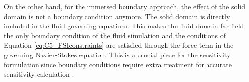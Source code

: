 On the other hand, for the immersed boundary approach, the effect of the solid domain is not a boundary condition anymore. The solid domain is directly included in the fluid governing equations. This makes the fluid domain far-field the only boundary condition of the fluid simulation and the conditions of Equation \eqref{eq:C5_FSIconstraints} are satisfied through the force term in the governing Navier-Stokes equation. This is a crucial piece for the sensitivity formulation since boundary conditions require extra treatment for accurate sensitivity calculation \cite{cross2015local}.
